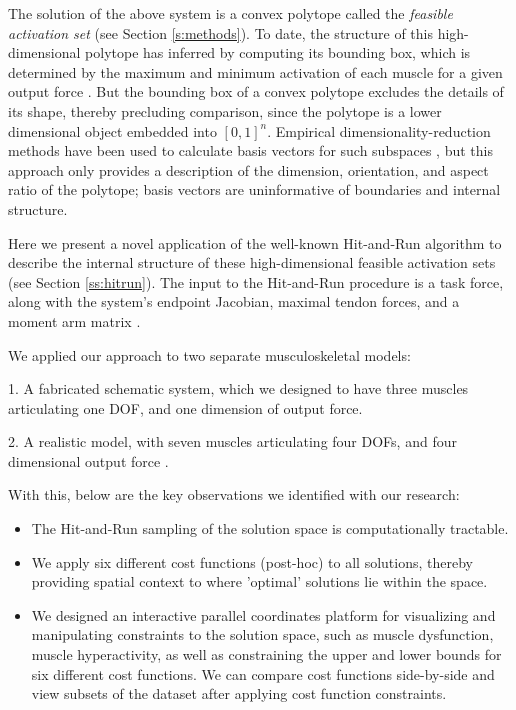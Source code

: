The solution of the above system is a convex polytope called the \emph{feasible activation set} (see Section \ref{s:methods}).
To date, the structure of this high-dimensional polytope has inferred by computing its bounding box, which is determined by the maximum and minimum activation of each muscle for a given output force \cite{kutch2011muscle,sohn2013cat_bounding_box,Valero-Cuevas2015high-dimensional}.
But the bounding box of a convex polytope excludes the details of its shape, thereby precluding comparison, since the polytope is a lower dimensional object embedded into $[0,1]^n$.
Empirical dimensionality-reduction methods have been used to calculate basis vectors for such subspaces \cite{Clewley2008Estimating,davella2005shared,krishnamoorthy2003muscle},
but this approach only provides a description of the dimension, orientation, and aspect ratio of the polytope; basis vectors are uninformative of boundaries and internal structure.

Here we present a novel application of the well-known Hit-and-Run algorithm \cite{smith1984efficient} to describe the internal structure of these high-dimensional feasible activation sets (see Section \ref{ss:hitrun}).
The input to the Hit-and-Run procedure is a task force, along with the system's endpoint Jacobian, maximal tendon forces, and a moment arm matrix \cite{Valero-Cuevas2009mathematical}.

We applied our approach to two separate musculoskeletal models:

1. A fabricated schematic system, which we designed to have three muscles articulating one DOF, and one dimension of output force.

2. A realistic model, with seven muscles articulating four DOFs, and four dimensional output force \cite{Valero-Cuevas1998Large}.

With this, below are the key observations we identified with our research:
\begin{itemize}
\item {The Hit-and-Run sampling of the solution space is computationally tractable.}
\item {We apply six different cost functions (post-hoc) to all solutions, thereby providing spatial context to where 'optimal' solutions lie within the space.}
\item {We designed an interactive parallel coordinates platform for visualizing and manipulating constraints to the solution space, such as muscle dysfunction, muscle hyperactivity, as well as constraining the upper and lower bounds for six different cost functions. We can compare cost functions side-by-side and view subsets of the dataset after applying cost function constraints. }
\end{itemize}


